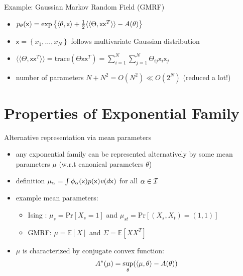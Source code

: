 \documentclass[t]{beamer}
\newcommand{\vx}{\ensuremath{\mathsf{x}}}
\newcommand{\vparam}{\ensuremath{\theta}}
\newcommand{\vmean}{\ensuremath{\mu}}
\newcommand{\mean}{\ensuremath{\mu_{\alpha}}}
\newcommand{\suff}{\ensuremath{\phi_{\alpha}}}
\newcommand{\set}[1]{\ensuremath{\left\{ #1 \right\}}}
\begin{document}
\begin{frame}{Example: Gaussian Markov Random Field (GMRF)}
	\begin{itemize}
		\item $\pp(\vx) = \exp \set{ \innerprod{\vparam, \vx} + \frac{1}{2} \langle\langle \Theta, \vx \vx^T \rangle\rangle - A(\theta) }$
		\item $\vx=\set{x_1, \ldots, x_N}$ follows multivariate Gaussian distribution
		\item $\langle\langle \Theta, \vx \vx^T \rangle\rangle = \text{trace}(\Theta \vx \vx^T)  = \sum\limits_{i=1}^N \sum\limits_{j=1}^N \Theta_{ij} \vx_i\vx_j $
    	\item number of parameters $N + N^2 = O(N^2) \ll O(2^N)$ (reduced a lot!)
	\end{itemize}
\end{frame}


\section{Properties of Exponential Family}

\begin{frame}{Alternative representation via mean parameters}
	\begin{itemize}
		\item any exponential family can be represented alternatively by some mean parameters $
		\vmean$ (w.r.t canonical parameters $\vparam$)
		\item definition $\mean = \int  \suff(\vx) p(\vx) \measure(d \vx) $ for all $\alpha \in \mathcal{I}$
		\item {example mean parameters:
		\begin{itemize}		
			\item Ising : $\mu_s=\text{Pr}[X_s=1]$ and $\mu_{st}=\text{Pr}[(X_{s}, X_{t})=(1, 1)] $
			\item GMRF: $\mu=\mathbb{E}[X]$ and $\Sigma=\mathbb{E}[XX^T]$
		\end{itemize}			
		}
		\item {$\vmean$ is characterized by conjugate convex function: 
		\begin{equation}
			\label{conjugate}
			A^{*}(\vmean) = \sup_{\vparam} (\innerprod{\vmean, \vparam} - A(\vparam))
		\end{equation}
		}	
	\end{itemize}
\end{frame}
\end{document}
